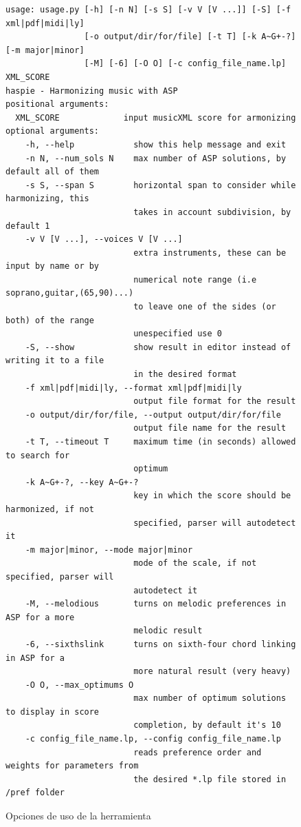 \begin{figure}
	\begin{verbatim}
usage: usage.py [-h] [-n N] [-s S] [-v V [V ...]] [-S] [-f xml|pdf|midi|ly]
                [-o output/dir/for/file] [-t T] [-k A~G+-?] [-m major|minor]
                [-M] [-6] [-O O] [-c config_file_name.lp] XML_SCORE
haspie - Harmonizing music with ASP
positional arguments:
  XML_SCORE             input musicXML score for armonizing
optional arguments:
    -h, --help            show this help message and exit
    -n N, --num_sols N    max number of ASP solutions, by default all of them
    -s S, --span S        horizontal span to consider while harmonizing, this
                          takes in account subdivision, by default 1
    -v V [V ...], --voices V [V ...]
                          extra instruments, these can be input by name or by
                          numerical note range (i.e soprano,guitar,(65,90)...)
                          to leave one of the sides (or both) of the range
                          unespecified use 0
    -S, --show            show result in editor instead of writing it to a file
                          in the desired format
    -f xml|pdf|midi|ly, --format xml|pdf|midi|ly
                          output file format for the result
    -o output/dir/for/file, --output output/dir/for/file
                          output file name for the result
    -t T, --timeout T     maximum time (in seconds) allowed to search for 
                          optimum
    -k A~G+-?, --key A~G+-?
                          key in which the score should be harmonized, if not
                          specified, parser will autodetect it
    -m major|minor, --mode major|minor
                          mode of the scale, if not specified, parser will 
                          autodetect it
    -M, --melodious       turns on melodic preferences in ASP for a more
                          melodic result
    -6, --sixthslink      turns on sixth-four chord linking in ASP for a
                          more natural result (very heavy)
    -O O, --max_optimums O
                          max number of optimum solutions to display in score
                          completion, by default it's 10
    -c config_file_name.lp, --config config_file_name.lp
                          reads preference order and weights for parameters from 
                          the desired *.lp file stored in /pref folder
	\end{verbatim}
	\label{fig:usage}
	\caption{Opciones de uso de la herramienta}
\end{figure}

